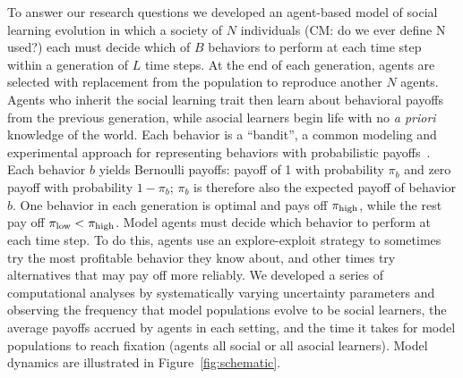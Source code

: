 \documentclass[letterpaper,11.5pt]{scrartcl}
\newcommand{\cm}[1]{{\textcolor{mypurple} {({\tiny CM:} #1)}}}
\begin{document}
To answer our research questions we developed an agent-based model of social
learning evolution in which a society of $N$ individuals \cm{do we ever define N used?} each must decide which of
$B$ behaviors to perform at each time step within a generation of $L$ time steps. At
the end of each generation, agents are selected with replacement from the population
to reproduce another $N$ agents. Agents who inherit the social learning trait then
learn about behavioral payoffs from the previous generation, while asocial learners
begin life with no \emph{a priori} knowledge of the world.  Each behavior is a
``bandit'', a common modeling and experimental approach for representing behaviors
with probabilistic
payoffs~\cite{SuttonBartoBook,McElreath2005,Steyvers2009,Rendell2010,Schulz2019}.  Each behavior
$b$ yields Bernoulli payoffs: payoff of 1 with probability $\pi_b$ and zero payoff
with probability $1 - \pi_b$; $\pi_b$ is therefore also the expected payoff of
behavior $b$. One behavior in each generation is optimal and pays off $\pi_{\mathrm{high}}$,
while the rest pay off $\pi_{\mathrm{low}} < \pi_{\mathrm{high}}$.  Model agents must decide which behavior
to perform at each time step.  To do this, agents use an explore-exploit strategy to
sometimes try the most profitable behavior they know about, and other times try
alternatives that may pay off more reliably.  We developed a series of computational
analyses by systematically varying uncertainty parameters and observing the
frequency that model populations evolve to be social learners, the average payoffs
accrued by agents in each setting, and the time it takes for model populations to
reach fixation (agents all social or all asocial learners). Model dynamics are
illustrated in Figure~\ref{fig:schematic}.
\end{document}
